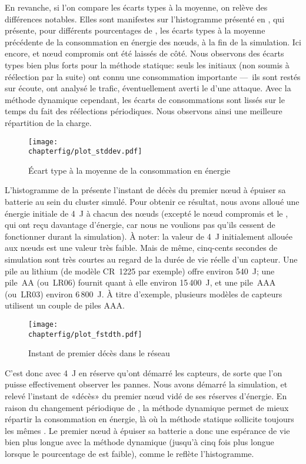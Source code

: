 En revanche, si l'on compare les écarts types à la moyenne, on relève des différences notables.
Elles sont manifestes sur l'histogramme présenté en , qui présente, pour différents pourcentages de \cns, les écarts types à la moyenne précédente de la consommation en énergie des nœuds, à la fin de la simulation.
Ici encore, \ch et nœud compromis ont été laissés de côté.
Nous observons des écarts types bien plus forts pour la méthode statique: seuls les \cns initiaux (non soumis à réélection par la suite) ont connu une consommation importante ---~ils sont restés sur écoute, ont analysé le trafic, éventuellement averti le \ch d'une attaque.
Avec la méthode dynamique cependant, les écarts de consommations sont lissés sur le temps du fait des réélections périodiques.
Nous observons ainsi une meilleure répartition de la charge.
\begin{figure}[ht]
    \centering
    \texttt{[image: \\chapterfig/plot\_stddev.pdf]}
    \caption{Écart type à la moyenne de la consommation en énergie}\label{sa:fig:conso-ecart-type}
\end{figure}

L'histogramme de la  présente l'instant de décès du premier nœud à épuiser sa batterie au sein du cluster simulé.
Pour obtenir ce résultat, nous avons alloué une énergie initiale de 4~J à chacun des nœuds (excepté le nœud compromis et le \ch, qui ont reçu davantage d'énergie, car nous ne voulions pas qu'ils cessent de fonctionner durant la simulation).
À noter: la valeur de 4~J initialement allouée aux nœuds est une valeur très faible.
Mais de même, cinq-cents secondes de simulation sont très courtes au regard de la durée de vie réelle d'un capteur.
Une pile au lithium (de modèle CR~1225 par exemple) offre environ 540~J; une pile~AA (ou~LR06) fournit quant à elle environ 15\,400~J, et une pile~AAA (ou~LR03) environ 6\,800~J.
À titre d'exemple, plusieurs modèles de capteurs utilisent un couple de piles AAA.
\begin{figure}[ht]
    \centering
    \texttt{[image: \\chapterfig/plot\_fstdth.pdf]}
    \caption{Instant de premier décès dans le réseau}\label{sa:fig:premier-deces}
\end{figure}
%

C'est donc avec 4~J en réserve qu'ont démarré les capteurs, de sorte que l'on puisse effectivement observer les pannes.
Nous avons démarré la simulation, et relevé l'instant de «décès» du premier nœud vidé de ses réserves d'énergie.
En raison du changement périodique de \cns, la méthode dynamique permet de mieux répartir la consommation en énergie, là où la méthode statique sollicite toujours les mêmes \cns.
Le premier nœud à épuiser sa batterie a donc une espérance de vie bien plus longue avec la méthode dynamique (jusqu'à cinq fois plus longue lorsque le pourcentage de \cns est faible), comme le reflète l'histogramme.


